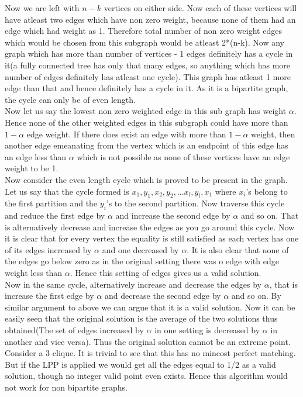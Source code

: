 \documentclass[solution,addpoints,12pt]{exam}
\begin{document}
\begin{questions}
Now we are left with $n-k$ vertices on either side. Now each
of these vertices will have atleast two edges which have non zero weight,
because none of them had an edge which had weight as 1. Therefore total
number of non zero weight edges which would be chosen from this subgraph
would be atleast 2*(n-k). Now any graph which has more than number
of vertices - 1 edges definitely has a cycle in it(a fully connected
tree has only that many edges, so anything which has more number of edges
definitely has atleast one cycle). This graph has atleast
1 more edge than that and hence definitely has a cycle in it.
As it is a bipartite graph, the cycle can only be of even length.\\

Now let us say the lowest non zero weighted edge in this sub graph
has weight $\alpha$. Hence none of the other weighted edges
in this subgraph could have more than $1 - \alpha$ edge weight.
If there does exist an edge with more than $1 - \alpha$ weight, then
another edge emeanating from the vertex which is an endpoint of this
edge has an edge less than $\alpha$ which is not possible as none
of these vertices have an edge weight to be 1.\\

Now consider the even length cycle which is proved to be present
in the graph. Let us say that the cycle formed is $x_1, y_1, x_2, y_2,... x_l, y_l, x_1$ where $x_i$'s belong to the first partition and the $y_i$'s
to the second partition. Now traverse this cycle and reduce the first
edge by $\alpha$ and increase the second edge by $\alpha$ and so on.
That is alternatively decrease and increase the edges as you go around this
cycle. Now it is clear that for every vertex the equality is still
satisfied as each vertex has one of its edges increased by $\alpha$
and one decreased by $\alpha$. It is also clear that none of the
edges go below zero as in the original setting there was o edge
with edge weight less than $\alpha$. Hence this setting of
edges gives us a valid solution.\\

Now in the same cycle, alternatively increase and decrease the edges
by $\alpha$, that is increase the first edge by $\alpha$ and decrease
the second edge by $\alpha$ and so on. By similar argument to above we
can argue that it is a valid solution. Now it can be easily seen
that the original solution is the average of the two solutions
thus obtained(The set of edges increased by $\alpha$ in one setting
is decreased by $\alpha$ in another and vice versa).
Thus the original solution cannot be an extreme point.\\

Consider a 3 clique. It is trivial to see that this has no
mincost perfect matching. But if the LPP is applied we would
get all the edges equal to 1/2 as a valid solution, though
no integer valid point even exists. Hence this algorithm would not
work for non bipartite graphs.


\end{questions}
\end{document}
